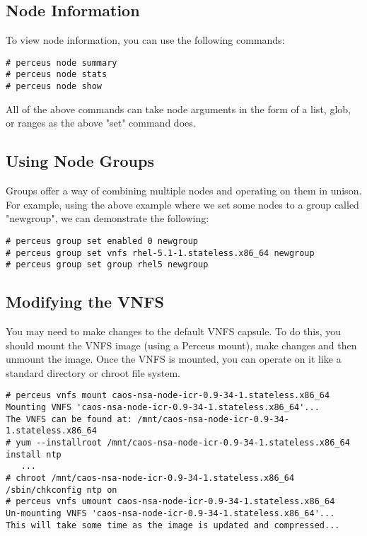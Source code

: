 \documentclass[10pt,letterpaper]{article}
\begin{document}
\subsection{Node Information}
To view node information, you can use the following commands:

\begin{verbatim}
# perceus node summary
# perceus node stats
# perceus node show
\end{verbatim}

All of the above commands can take node arguments in the form of a list, glob,
or ranges as the above "set" command does.

\subsection{Using Node Groups}
Groups offer a way of combining multiple nodes and operating on them in unison.
For example, using the above example where we set some nodes to a group called
"newgroup", we can demonstrate the following:

\begin{verbatim}
# perceus group set enabled 0 newgroup
# perceus group set vnfs rhel-5.1-1.stateless.x86_64 newgroup
# perceus group set group rhel5 newgroup
\end{verbatim}

\subsection{Modifying the VNFS}
You may need to make changes to the default VNFS capsule. To do this, you
should mount the VNFS image (using a Perceus mount), make changes and then
unmount the image. Once the VNFS is mounted, you can operate on it like a
standard directory or chroot file system.

\begin{verbatim}
# perceus vnfs mount caos-nsa-node-icr-0.9-34-1.stateless.x86_64
Mounting VNFS 'caos-nsa-node-icr-0.9-34-1.stateless.x86_64'...
The VNFS can be found at: /mnt/caos-nsa-node-icr-0.9-34-1.stateless.x86_64
# yum --installroot /mnt/caos-nsa-node-icr-0.9-34-1.stateless.x86_64 install ntp
   ...
# chroot /mnt/caos-nsa-node-icr-0.9-34-1.stateless.x86_64 /sbin/chkconfig ntp on
# perceus vnfs umount caos-nsa-node-icr-0.9-34-1.stateless.x86_64
Un-mounting VNFS 'caos-nsa-node-icr-0.9-34-1.stateless.x86_64'...
This will take some time as the image is updated and compressed...
\end{verbatim}
\end{document}
